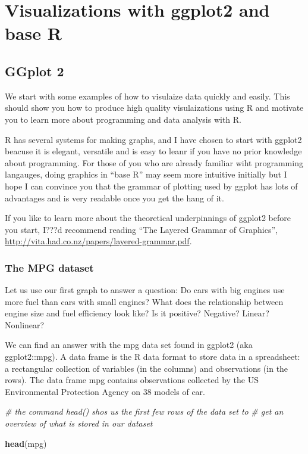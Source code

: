 \documentclass[]{article}
\newenvironment{Shaded}{\begin{snugshade}}{\end{snugshade}}
\newcommand{\CommentTok}[1]{\textcolor[rgb]{0.56,0.35,0.01}{\textit{#1}}}
\newcommand{\KeywordTok}[1]{\textcolor[rgb]{0.13,0.29,0.53}{\textbf{#1}}}
\newcommand{\NormalTok}[1]{#1}
\begin{document}
\hypertarget{visualizations-with-ggplot2-and-base-r}{%
\section{Visualizations with ggplot2 and base
R}\label{visualizations-with-ggplot2-and-base-r}}

\hypertarget{ggplot-2}{%
\subsection{GGplot 2}\label{ggplot-2}}

We start with some examples of how to visulaize data quickly and easily.
This should show you how to produce high quality visulaizations using R
and motivate you to learn more about programming and data analysis with
R.

R has several systems for making graphs, and I have chosen to start with
ggplot2 beacuse it is elegant, versatile and is easy to leanr if you
have no prior knowledge about programming. For those of you who are
already familiar wiht programming langauges, doing graphics in ``base
R'' may seem more intuitive initially but I hope I can convince you that
the grammar of plotting used by ggplot has lots of advantages and is
very readable once you get the hang of it.

If you like to learn more about the theoretical underpinnings of ggplot2
before you start, I???d recommend reading ``The Layered Grammar of
Graphics'', \url{http://vita.had.co.nz/papers/layered-grammar.pdf}.

\hypertarget{the-mpg-dataset}{%
\subsubsection{The MPG dataset}\label{the-mpg-dataset}}

Let us use our first graph to answer a question: Do cars with big
engines use more fuel than cars with small engines? What does the
relationship between engine size and fuel efficiency look like? Is it
positive? Negative? Linear? Nonlinear?

We can find an answer with the mpg data set found in ggplot2 (aka
ggplot2::mpg). A data frame is the R data format to store data in a
spreadsheet: a rectangular collection of variables (in the columns) and
observations (in the rows). The data frame mpg contains observations
collected by the US Environmental Protection Agency on 38 models of car.

\begin{Shaded}
\begin{Highlighting}[]
\CommentTok{# the command head() shos us the first few rows of the data set to }
\CommentTok{# get an overview of what is stored in our dataset}

\KeywordTok{head}\NormalTok{(mpg)}
\end{Highlighting}
\end{Shaded}
\end{document}
